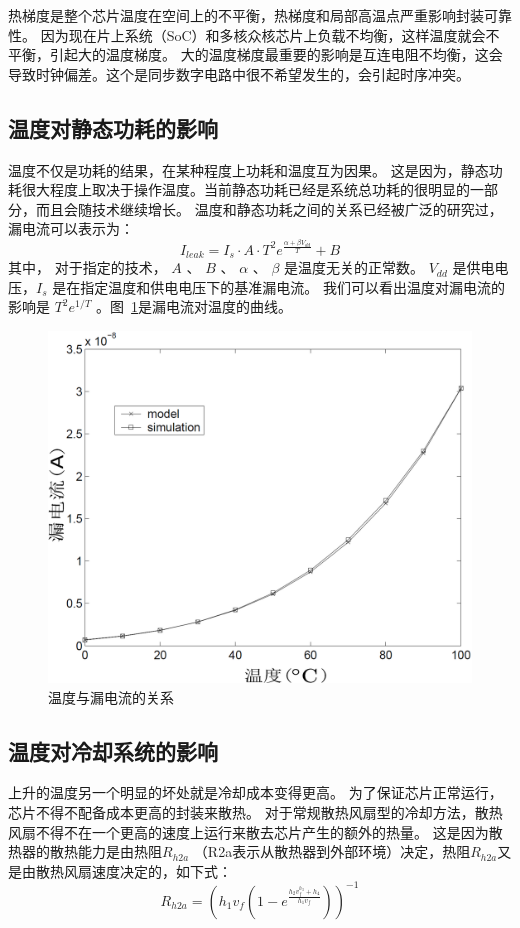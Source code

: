 热梯度是整个芯片温度在空间上的不平衡，热梯度和局部高温点严重影响封装可靠性。
因为现在片上系统（SoC）和多核众核芯片上负载不均衡，这样温度就会不平衡，引起大的温度梯度。
大的温度梯度最重要的影响是互连电阻不均衡，这会导致时钟偏差。这个是同步数字电路中很不希望发生的，会引起时序冲突。

\subsection{温度对静态功耗的影响}\label{sec:leakage}

温度不仅是功耗的结果，在某种程度上功耗和温度互为因果。
这是因为，静态功耗很大程度上取决于操作温度。当前静态功耗已经是系统总功耗的很明显的一部分，而且会随技术继续增长。
温度和静态功耗之间的关系已经被广泛的研究过\cite{liao2005temperature}，漏电流可以表示为：
\begin{equation}
I_{leak} = I_s \cdot A \cdot T^2e^{\frac{\alpha + \beta V_{dd}}{T}}+B
\end{equation}
其中， 对于指定的技术， $A$ 、 $B$ 、  $\alpha$ 、 $\beta$ 是温度无关的正常数。
$V_{dd}$ 是供电电压，$I_s$ 是在指定温度和供电电压下的基准漏电流。
我们可以看出温度对漏电流的影响是 $T^2e^{1/T}$ 。图~\ref{fig:leakage}是漏电流对温度的曲线。
\begin{figure}
  \centering
    \includegraphics[width=0.7\columnwidth]{fig/leakage}
  \caption{温度与漏电流的关系\cite{zhang2003hotleakage}}\label{fig:leakage}
\end{figure}

\subsection{温度对冷却系统的影响}\label{sec:cooling}

上升的温度另一个明显的坏处就是冷却成本变得更高。
为了保证芯片正常运行，芯片不得不配备成本更高的封装来散热。
对于常规散热风扇型的冷却方法，散热风扇不得不在一个更高的速度上运行来散去芯片产生的额外的热量。
这是因为散热器的散热能力是由热阻$R_{h2a}$ （R2a表示从散热器到外部环境）决定，热阻$R_{h2a}$又是由散热风扇速度决定的，如下式：
\begin{equation}\label{eq:cooling}
R_{h2a} = (h_1v_f(1-e^{\frac{h_2v_f^{h_3}+h_4}{h_1v_f}}))^{-1}
\end{equation}

